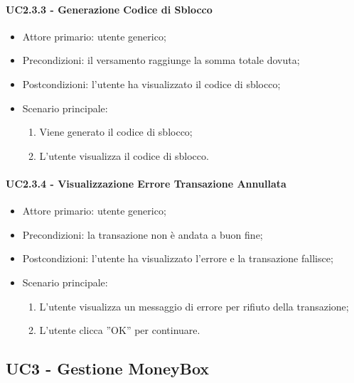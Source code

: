 \paragraph{UC2.3.3 - Generazione Codice di Sblocco}

\begin{itemize}
    \item Attore primario: utente generico;
    \item Precondizioni: il versamento raggiunge la somma totale dovuta;
    \item Postcondizioni: l'utente ha visualizzato il codice di sblocco;
    \item Scenario principale:
          \begin{enumerate}
              \item Viene generato il codice di sblocco;
              \item L'utente visualizza il codice di sblocco.
          \end{enumerate}
\end{itemize}

\paragraph{UC2.3.4 - Visualizzazione Errore Transazione Annullata}

\begin{itemize}
    \item Attore primario: utente generico;
    \item Precondizioni: la transazione non è andata a buon fine;
    \item Postcondizioni: l'utente ha visualizzato l'errore e la transazione fallisce;
    \item Scenario principale:
          \begin{enumerate}
              \item L'utente visualizza un messaggio di errore per rifiuto della transazione;
              \item L'utente clicca ”OK” per continuare.
          \end{enumerate}
\end{itemize}

\subsection{UC3 - Gestione MoneyBox}

